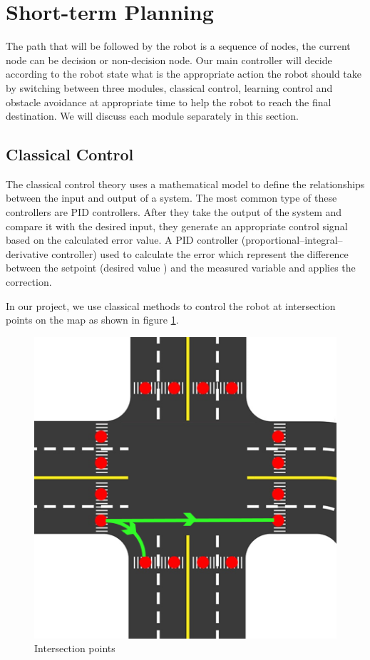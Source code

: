 \section{Short-term Planning}

\hspace{2cm} The path that will be followed by the robot is a sequence of nodes, the current node can be decision or non-decision node. Our main controller will decide according to the robot state what is the appropriate action the robot should take by switching between three modules, classical control, learning control and obstacle avoidance at appropriate time to help the robot to reach the final destination. We will discuss each module separately in this section.

\subsection{Classical Control}

\hspace{2cm} The classical control theory uses a mathematical model to define the relationships between the input and output of a system. The most common type of these controllers are PID controllers. After they take the output of the system and compare it with the desired input, they generate an appropriate control signal based on the calculated error value.\cite{classical_control} A PID controller (proportional–integral–derivative controller) used to calculate the error which represent the difference between the setpoint (desired value ) and the measured variable and applies the correction.

In our project, we use classical methods to control the robot at intersection points on the map as shown in figure \ref{fig:intersetion points}. 
   \begin{figure}[H]%
    \center%
    \includegraphics[width=.5\textwidth]
    {images/Alzahraa/intersectionPoints.png}%
    \caption[Map's Intersection Points]{Intersection points}\label{fig:intersetion points}%
  \end{figure}
  
